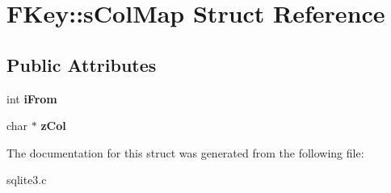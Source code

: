 \hypertarget{structFKey_1_1sColMap}{}\section{F\+Key\+:\+:s\+Col\+Map Struct Reference}
\label{structFKey_1_1sColMap}
\subsection*{Public Attributes}
\begin{DoxyCompactItemize}
\item 
int {\bfseries i\+From}\hypertarget{structFKey_1_1sColMap_a2b0ed19d4924a93d1f3f14f891b176ed}{}\label{structFKey_1_1sColMap_a2b0ed19d4924a93d1f3f14f891b176ed}

\item 
char $\ast$ {\bfseries z\+Col}\hypertarget{structFKey_1_1sColMap_a4cdef475be73cc460873051a2c2c2937}{}\label{structFKey_1_1sColMap_a4cdef475be73cc460873051a2c2c2937}

\end{DoxyCompactItemize}


The documentation for this struct was generated from the following file\+:\begin{DoxyCompactItemize}
\item 
sqlite3.\+c\end{DoxyCompactItemize}
